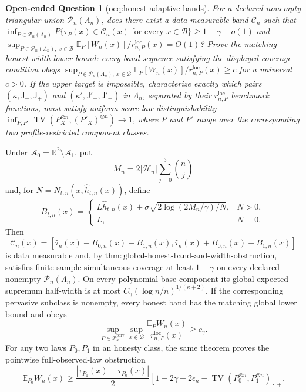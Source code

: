 \documentclass{article}
\newtheorem{openendedquestion}{Open-ended Question}
\begin{document}
\begin{openendedquestion}[oeq:honest-adaptive-bands]\label{oeq:honest-adaptive-bands}
For a declared nonempty triangular union \(\mathcal P_n(\Lambda_n)\), does there exist a data-measurable band \(\mathcal C_n\) such that \(\inf_{P\in\mathcal P_n(\Lambda_n)}P\{\tau_P(x)\in\mathcal C_n(x)\text{ for every }x\in\mathcal B\}\ge1-\gamma-o(1)\) and \(\sup_{P\in\mathcal P_n(\Lambda_n),\ x\in\mathcal B}\mathbb E_P[W_n(x)]/r_{n,P}^{\mathrm{loc}}(x)=O(1)\)? Prove the matching honest-width lower bound: every band sequence satisfying the displayed coverage condition obeys \(\sup_{P\in\mathcal P_n(\Lambda_n),\ x\in\mathcal B}\mathbb E_P[W_n(x)]/r_{n,P}^{\mathrm{loc}}(x)\ge c\) for a universal \(c>0\). If the upper target is impossible, characterize exactly which pairs \((\kappa,\mathsf J_{-},\mathsf J_{+})\) and \((\kappa',\mathsf J'_{-},\mathsf J'_{+})\) in \(\Lambda_n\), separated by their \(r_{n,P}^{\mathrm{loc}}\) benchmark functions, must satisfy uniform score-law distinguishability \(\inf_{P,P'}\operatorname{TV}(P_X^{\otimes n},(P'_X)^{\otimes n})\to1\), where \(P\) and \(P'\) range over the corresponding two profile-restricted component classes.
\end{openendedquestion}
Under \(\mathcal A_0=\mathbb R^2\setminus\mathcal A_1\), put
\[
 M_n=2|\mathcal H_n|\sum_{j=0}^3\binom nj
\]
and, for \(N=N_{t,n}(x,\widehat h_{t,n}(x))\), define
\[
 B_{t,n}(x)=
 \begin{cases}
 L\widehat h_{t,n}(x)+
 \sigma\sqrt{2\log(2M_n/\gamma)/N},&N>0,\\
 L,&N=0.
 \end{cases}
\]
Then
\[
 \mathcal C_n(x)=
 \left[\widehat\tau_n(x)-B_{0,n}(x)-B_{1,n}(x),
       \widehat\tau_n(x)+B_{0,n}(x)+B_{1,n}(x)\right]
\]
is data measurable and, by
\(\mathrm{thm:global\text{-}honest\text{-}band\text{-}and\text{-}width\text{-}obstruction}\),
satisfies finite-sample simultaneous coverage at least \(1-\gamma\) on
every declared nonempty \(\mathcal P_n(\Lambda_n)\).  On every polynomial
base component its global expected-supremum half-width is at most
\(C_\gamma(\log n/n)^{1/(\kappa+2)}\).  If the corresponding pervasive
subclass is nonempty, every honest band has the matching global lower
bound and obeys
\[
 \sup_{P\in\mathcal P_\kappa^{\mathrm{perv}}}
 \sup_{x\in\mathcal B}
 \frac{\mathbb E_PW_n(x)}{r_{n,P}^{\mathrm{loc}}(x)}\ge c_\gamma.
\]
For any two laws \(P_0,P_1\) in an honesty class, the same theorem proves
the pointwise full-observed-law obstruction
\[
 \mathbb E_{P_0}W_n(x)\ge
 \frac{|\tau_{P_1}(x)-\tau_{P_0}(x)|}{2}
 \left[1-2\gamma-2\epsilon_n-
 \operatorname{TV}(P_0^{\otimes n},P_1^{\otimes n})\right]_+.
\]
\end{document}
